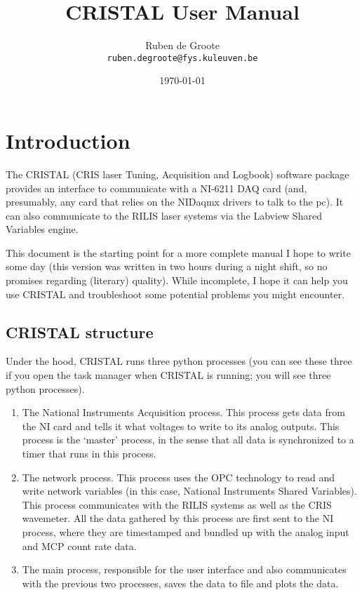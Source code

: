\documentclass[10pt,a4paper]{article}
\begin{document}
\author{Ruben de Groote\\
        \texttt{ruben.degroote@fys.kuleuven.be}}
\date{\today}
\title{CRISTAL User Manual}
\maketitle
\tableofcontents
\newpage

\section{Introduction}

The CRISTAL (CRIS laser Tuning, Acquisition and Logbook) software package provides an interface to communicate with a NI-6211 DAQ card (and, presumably, any card that relies on the NIDaqmx drivers to talk to the pc). It can also communicate to the RILIS laser systems via the Labview Shared Variables engine.

This document is the starting point for a more complete manual I hope to write some day (this version was written in two hours during a night shift, so no promises regarding (literary) quality). While incomplete, I hope it can help you use CRISTAL and troubleshoot some potential problems you might encounter.\\


\subsection{CRISTAL structure}

Under the hood, CRISTAL runs three python processes (you can see these three if you open the task manager when CRISTAL is running; you will see three python processes).

\begin{enumerate}
    \item The National Instruments Acquisition process. This process gets data from the NI card and tells it what voltages to write to its analog outputs. This process is the `master' process, in the sense that all data is synchronized to a timer that runs in this process. 
    \item The network process. This process uses the OPC technology to read and write network variables (in  this case, National Instruments Shared Variables). This process communicates with the RILIS systems as well as the CRIS wavemeter. All the data gathered by this process are first sent to the NI process, where they are timestamped and bundled up with the analog input and MCP count rate data.
    \item The main process, responsible for the user interface and also communicates with the previous two processes, saves the data to file and plots the data.
\end{enumerate}
\end{document}
